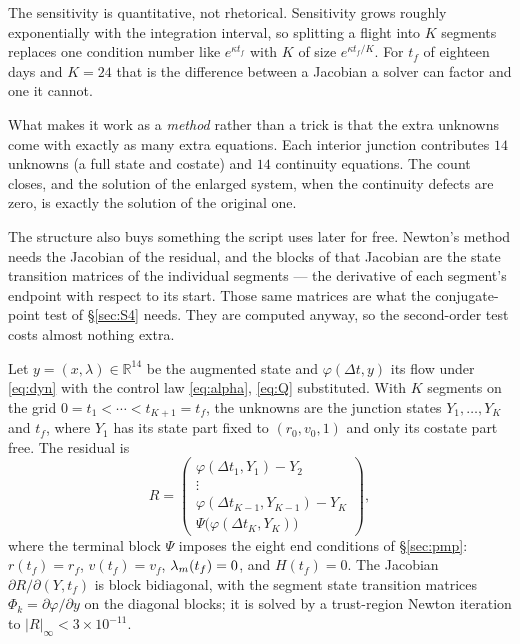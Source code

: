 \documentclass[11pt]{article}
\newcommand{\tf}{t_f}\newcommand{\R}{\mathbb{R}}
\begin{document}
\begin{intu}
The sensitivity is quantitative, not rhetorical. Sensitivity grows roughly
exponentially with the integration interval, so splitting a flight into $K$
segments replaces one condition number like $e^{\kappa \tf}$ with $K$ of size
$e^{\kappa \tf / K}$. For $\tf$ of eighteen days and $K = 24$ that is the
difference between a Jacobian a solver can factor and one it cannot.

What makes it work as a \emph{method} rather than a trick is that the extra
unknowns come with exactly as many extra equations. Each interior junction
contributes $14$ unknowns (a full state and costate) and $14$ continuity
equations. The count closes, and the solution of the enlarged system, when the
continuity defects are zero, is exactly the solution of the original one.

The structure also buys something the script uses later for free. Newton's
method needs the Jacobian of the residual, and the blocks of that Jacobian are
the state transition matrices of the individual segments --- the derivative of
each segment's endpoint with respect to its start. Those same matrices are what
the conjugate-point test of \S\ref{sec:S4} needs. They are computed anyway, so
the second-order test costs almost nothing extra.
\end{intu}

\begin{rig}
Let $y = (x, \lambda) \in \R^{14}$ be the augmented state and $\varphi(\Delta t, y)$
its flow under \eqref{eq:dyn} with the control law \eqref{eq:alpha},
\eqref{eq:Q} substituted. With $K$ segments on the grid
$0 = t_1 < \cdots < t_{K+1} = \tf$, the unknowns are the junction states
$Y_1, \dots, Y_K$ and $\tf$, where $Y_1$ has its state part fixed to
$(r_0, v_0, 1)$ and only its costate part free. The residual is
\begin{equation}\label{eq:ms}
R = \begin{pmatrix}
\varphi(\Delta t_1, Y_1) - Y_2 \\
\vdots \\
\varphi(\Delta t_{K-1}, Y_{K-1}) - Y_K \\
\Psi\big(\varphi(\Delta t_K, Y_K)\big)
\end{pmatrix},
\end{equation}
where the terminal block $\Psi$ imposes the eight end conditions of
\S\ref{sec:pmp}: $r(\tf) = r_f$, $v(\tf) = v_f$, $\lm(\tf) = 0$, and
$H(\tf) = 0$. The Jacobian $\partial R / \partial(Y, \tf)$ is block
bidiagonal, with the segment state transition matrices
$\Phi_k = \partial \varphi / \partial y$ on the diagonal blocks; it is solved
by a trust-region Newton iteration to $|R|_\infty < 3\times10^{-11}$.
\end{rig}
\end{document}
